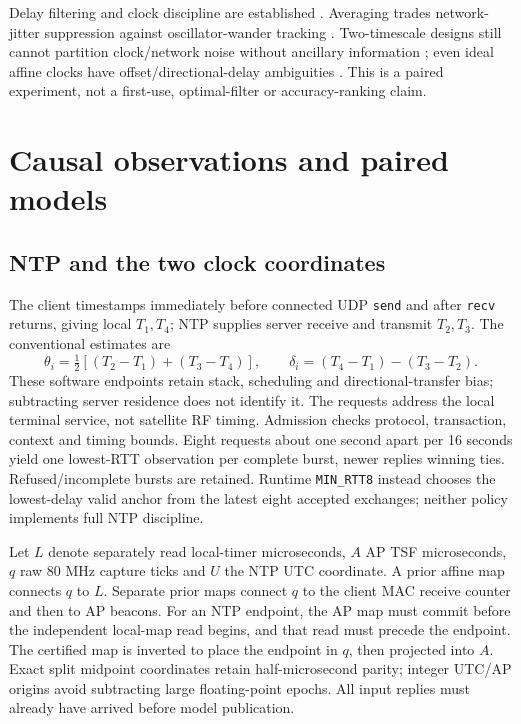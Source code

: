 \documentclass[10pt,letterpaper]{article}
\begin{document}
Delay filtering and clock discipline are established \citep{rfc5905,chrony}.
Averaging trades network-jitter suppression against oscillator-wander tracking
\citep{ntpdiscipline}. Two-timescale designs still cannot partition clock/network
noise without ancillary information \citep{levine2016}; even ideal affine clocks
have offset/directional-delay ambiguities \citep{freris2011}. This is a paired
experiment, not a first-use, optimal-filter or accuracy-ranking claim.

\section{Causal observations and paired models}
\subsection{NTP and the two clock coordinates}
The client timestamps immediately before connected UDP \texttt{send} and after
\texttt{recv} returns, giving local $T_1,T_4$; NTP supplies server receive and
transmit $T_2,T_3$. The conventional estimates are \citep{rfc5905}
\begin{equation}
 \theta_i=\tfrac12[(T_2-T_1)+(T_3-T_4)],\qquad
 \delta_i=(T_4-T_1)-(T_3-T_2).
\end{equation}
These software endpoints retain stack, scheduling and directional-transfer
bias; subtracting server residence does not identify it. The requests address
the local terminal service, not satellite RF timing. Admission checks protocol,
transaction, context and timing bounds. Eight requests about one second apart
per 16 seconds yield one lowest-RTT observation per complete burst, newer replies
winning ties. Refused/incomplete bursts are retained. Runtime
\texttt{MIN\_RTT8} instead chooses the lowest-delay valid anchor from the latest
eight accepted exchanges; neither policy implements full NTP discipline.

Let $L$ denote separately read local-timer microseconds, $A$ AP TSF microseconds,
$q$ raw 80 MHz capture ticks and $U$ the NTP UTC coordinate. A prior affine map
connects $q$ to $L$. Separate prior maps connect $q$ to the client MAC receive
counter and then to AP beacons. For an NTP endpoint, the AP map must commit
before the independent local-map read begins, and that read must precede the
endpoint. The certified map is inverted to place the endpoint in $q$, then
projected into $A$. Exact split midpoint coordinates retain half-microsecond
parity; integer UTC/AP origins avoid subtracting large floating-point epochs.
All input replies must already have arrived before model publication.
\end{document}
